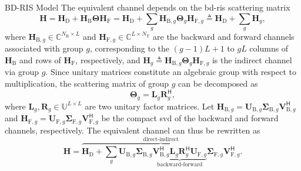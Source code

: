 \begin{section}{BD-RIS Model}
	The equivalent channel depends on the \gls{bd}-\gls{ris} scattering matrix
	\begin{equation}
		\mathbf{H} = \mathbf{H}_\mathrm{D} + \mathbf{H}_\mathrm{B} \mathbf{\Theta} \mathbf{H}_\mathrm{F} = \mathbf{H}_\mathrm{D} + \sum_g \mathbf{H}_{\mathrm{B},g} \mathbf{\Theta}_g \mathbf{H}_{\mathrm{F},g} \triangleq \mathbf{H}_\mathrm{D} + \sum_g \mathbf{H}_g,
		\label{eq:channel_equivalent}
	\end{equation}
	where $\mathbf{H}_{\mathrm{B},g} \in \mathbb{C}^{N_\mathrm{R} \times L}$ and $\mathbf{H}_{\mathrm{F},g} \in \mathbb{C}^{L \times N_\mathrm{T}}$ are the backward and forward channels associated with group $g$, corresponding to the $(g{-}1)L{+}1$ to $gL$ columns of $\mathbf{H}_\mathrm{B}$ and rows of $\mathbf{H}_\mathrm{F}$, respectively, and $\mathbf{H}_g \triangleq \mathbf{H}_{\mathrm{B},g} \mathbf{\Theta}_g \mathbf{H}_{\mathrm{F},g}$ is the indirect channel via group $g$.
	Since unitary matrices constitute an algebraic group with respect to multiplication, the scattering matrix of group $g$ can be decomposed as
	\begin{equation}
		\mathbf{\Theta}_g = \mathbf{L}_g \mathbf{R}_g^\mathsf{H},
	\end{equation}
	where $\mathbf{L}_g, \mathbf{R}_g \in \mathbb{U}^{L \times L}$ are two unitary factor matrices.
	Let $\mathbf{H}_{\mathrm{B},g} = \mathbf{U}_{\mathrm{B},g} \mathbf{\Sigma}_{\mathrm{B},g} \mathbf{V}_{\mathrm{B},g}^\mathsf{H}$ and $\mathbf{H}_{\mathrm{F},g} = \mathbf{U}_{\mathrm{F},g} \mathbf{\Sigma}_{\mathrm{F},g} \mathbf{V}_{\mathrm{F},g}^\mathsf{H}$ be the compact \gls{svd} of the backward and forward channels, respectively.
	The equivalent channel can thus be rewritten as
	\begin{equation}
		\mathbf{H} = \overbrace{\mathbf{H}_\mathrm{D} + \sum_g \mathbf{U}_{\mathrm{B},g} \mathbf{\Sigma}_{\mathrm{B},g} \underbrace{\mathbf{V}_{\mathrm{B},g}^\mathsf{H} \mathbf{L}_g \mathbf{R}_g^\mathsf{H} \mathbf{U}_{\mathrm{F},g}}_\text{backward-forward} \mathbf{\Sigma}_{\mathrm{F},g} \mathbf{V}_{\mathrm{F},g}^\mathsf{H}}^\text{direct-indirect}.
		\label{eq:channel_equivalent_svd}
	\end{equation}


\end{section}
